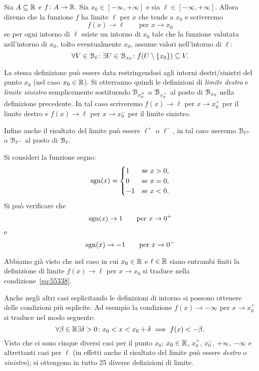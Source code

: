 \begin{definition}
\mymark{***}
Sia $A\subseteq \mathbb R$ e $f\colon A \to \mathbb R$. 
Sia $x_0\in [-\infty,+\infty]$
e sia $\ell \in [-\infty,+\infty]$.
Allora diremo che la funzione $f$ ha limite $\ell$ per $x$ che tende a $x_0$ 
e scriveremo
\[
  f(x) \to \ell \qquad \text{per $x\to x_0$}
\]
se per ogni intorno di $\ell$ esiste un intorno di $x_0$ tale che
la funzione valutata nell'intorno di $x_0$, tolto eventualmente $x_0$,
assume valori
nell'intorno di $\ell$:
\begin{equation}\label{eq:def_limite}
  \forall V \in \mathcal B_\ell \colon \exists U \in \mathcal B_{x_0} \colon f(U\setminus{\left\{ x_0 \right\}}) \subseteq V.
\end{equation}

La stessa definizione può essere data restringendosi agli intorni destri/sinistri del punto $x_0$ (nel caso $x_0 \in \mathbb R$). Si otterranno quindi le definizioni
di \emph{limite destro} e \emph{limite sinistro}
semplicemente sostituendo $\mathcal B_{x_0^+}$ o $\mathcal B_{x_0^-}$ al posto di 
$\mathcal B_{x_0}$ nella definizione
precedente. 
In tal caso scriveremo $f(x)\to \ell$ per $x\to x_0^+$ per il limite 
destro e $f(x)\to \ell$ per $x\to x_0^-$ per il limite sinistro.

Infine anche il risultato del limite può essere $\ell^+$ o $\ell^-$, 
in tal caso useremo $\mathcal B_{\ell^+}$ o $\mathcal B_{\ell^-}$ 
al posto di $\mathcal B_{\ell}$.
\end{definition}
  
\begin{example}
Si consideri la funzione segno:
\[
\operatorname{sgn}(x) =
\begin{cases}
  1 & \text{se $x>0$},\\
  0 & \text{se $x=0$},\\
  -1 & \text{se $x<0$}.
\end{cases}
\]
Si può verificare che
\[
\operatorname{sgn}(x) \to 1 \qquad \text{per $x\to 0^+$}
\]
e
\[
\operatorname{sgn}(x) \to -1 \qquad \text{per $x\to 0^-$}
\]
\end{example}

Abbiamo già visto che nel caso in cui $x_0\in \mathbb R$ e $\ell\in \mathbb R$ 
siano entrambi finiti 
la definizione di limite $f(x)\to \ell$ per $x\to x_0$
si traduce nella condizione~\eqref{eq:55338}.

Anche negli altri casi esplicitando le definizioni di intorno
si possono ottenere delle condizioni più esplicite.
Ad esempio la condizione $f(x)\to -\infty$ per $x\to x_0^+$
si traduce nel modo seguente:
\[
\forall \beta\in \mathbb R\exists \delta>0 \colon x_0 < x < x_0+\delta 
\implies f(x) < -\beta.  
\]
Visto che ci sono cinque diversi casi per il punto $x_0$:
$x_0\in \mathbb R$, $x_0^+$, $x_0^-$, $+\infty$, $-\infty$ e altrettanti 
casi per $\ell$ (in effetti anche il risultato del limite 
può essere \emph{destro} o \emph{sinistro}), si ottengono 
in tutto 25 diverse definizioni di limite.


